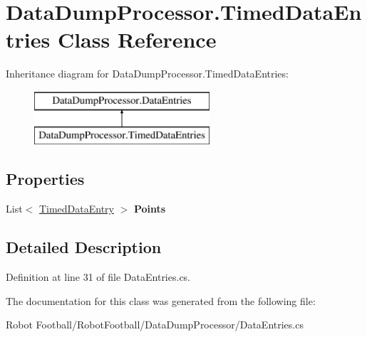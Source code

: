 \hypertarget{class_data_dump_processor_1_1_timed_data_entries}{\section{Data\-Dump\-Processor.\-Timed\-Data\-Entries Class Reference}
\label{class_data_dump_processor_1_1_timed_data_entries}
}
Inheritance diagram for Data\-Dump\-Processor.\-Timed\-Data\-Entries\-:\begin{figure}[H]
\begin{center}
\leavevmode
\includegraphics[height=2.000000cm]{class_data_dump_processor_1_1_timed_data_entries}
\end{center}
\end{figure}
\subsection*{Properties}
\begin{DoxyCompactItemize}
\item 
\hypertarget{class_data_dump_processor_1_1_timed_data_entries_a0f7dcbfd1246525f6bd489e571f48b3e}{List$<$ \hyperlink{struct_data_dump_processor_1_1_timed_data_entry}{Timed\-Data\-Entry} $>$ {\bfseries Points}}\label{class_data_dump_processor_1_1_timed_data_entries_a0f7dcbfd1246525f6bd489e571f48b3e}

\end{DoxyCompactItemize}


\subsection{Detailed Description}


Definition at line 31 of file Data\-Entries.\-cs.



The documentation for this class was generated from the following file\-:\begin{DoxyCompactItemize}
\item 
Robot Football/\-Robot\-Football/\-Data\-Dump\-Processor/Data\-Entries.\-cs\end{DoxyCompactItemize}
